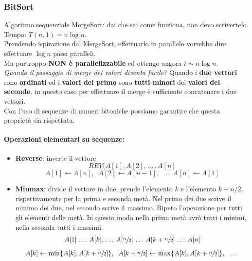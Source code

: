 \documentclass[11pt]{article}
\begin{document}
	\newpage
	
	\subsubsection{BitSort}
	
	Algoritmo sequenziale MergeSort: dai che sai come funziona, non devo scrivertelo. Tempo: $T(n, 1) = n \log n$.\\
	
	Prendendo ispirazione dal MergeSort, effettuarlo in parallelo vorrebbe dire effettuare $\log n$ passi paralleli.\\
	
	Ma purtroppo \textbf{NON è parallelizzabile} ed ottengo angora $t \sim n \log n$.\\
	
	\textit{Quando il passaggio di merge dei valori diventa facile?} Quando i \textbf{due vettori} sono \textbf{ordinati} ed i \textbf{valori del primo} sono \textbf{tutti minori} dei \textbf{valori del secondo}, in questo caso per effettuare il merge è sufficiente concatenare i due vettori.\\
	
	Con l'uso di sequenze di numeri bitoniche possiamo garantire che questa proprietà sia rispettata.\\
	
	\paragraph{Operazioni elementari su sequenze: }
	\begin{itemize}
		\item \textbf{Reverse}: inverte il vettore
		$$ REV(A[1], A[2], \, \dots \, , A[n] $$
		$$ A[1] \leftarrow A[n], \;\; A[2] \leftarrow A[n-1], \;\; \dots \;\; A[n] \leftarrow A[1] $$
		
		\item \textbf{Minmax}: divide il vettore in due, prende l'elemento $k$ e l'elemento $k + n/2$, rispettivamente per la prima e seconda metà. Nel primo dei due scrive il minimo dei due, nel secondo scrive il massimo. Ripeto l'operazione per tutti gli elementi delle metà. In questo modo nella prima metà avrò tutti i minimi, nella seconda tutti i massimi. 
		$$ A[1] \, \dots \, A[k], \, \dots \, A[\sfrac{n}{2}] \, \dots \, A[k + \sfrac{n}{2}] \, \dots \, A[n]$$
		 $$ A[k] \leftarrow \min \{A[k], A[k + \sfrac{n}{2}]\}, \;\; A[k + \sfrac{n}{2}] \leftarrow \max \{A[k], A[k + \sfrac{n}{2}]\}, \;\; \dots $$
	\end{itemize}
	
\end{document}

